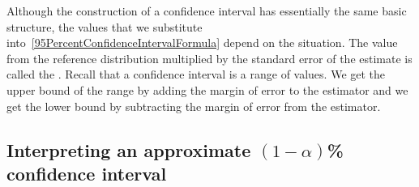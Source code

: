 Although the construction of a confidence interval has essentially the same basic structure, the  values
that we substitute into~\ref{95PercentConfidenceIntervalFormula} depend on the situation.
The value from the reference distribution multiplied by the standard error of the estimate is called
the .
Recall that a confidence interval is a range of values. 
We get the upper bound of the range by adding the margin of error to the estimator and we get the lower bound by subtracting the margin of error from the estimator.







\subsection{Interpreting an approximate $(1-\alpha)$\% confidence interval}
\label{interpretingCIs}


